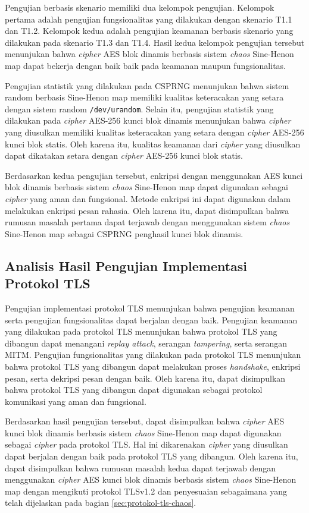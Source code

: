 Pengujian berbasis skenario memiliki dua kelompok pengujian. Kelompok pertama adalah pengujian fungsionalitas yang dilakukan dengan skenario T1.1 dan T1.2. Kelompok kedua adalah pengujian keamanan berbasis skenario yang dilakukan pada skenario T1.3 dan T1.4. Hasil kedua kelompok pengujian tersebut menunjukan bahwa \emph{cipher} AES blok dinamis berbasis sistem \emph{chaos} Sine-Henon map dapat bekerja dengan baik baik pada keamanan maupun fungsionalitas.

Pengujian statistik yang dilakukan pada CSPRNG menunjukan bahwa sistem random berbasis Sine-Henon map memiliki kualitas keteracakan yang setara dengan sistem random \texttt{/dev/urandom}. Selain itu, pengujian statistik yang dilakukan pada \emph{cipher} AES-256 kunci blok dinamis menunjukan bahwa \emph{cipher} yang diusulkan memiliki kualitas keteracakan yang setara dengan \emph{cipher} AES-256 kunci blok statis. Oleh karena itu, kualitas keamanan dari \emph{cipher} yang diusulkan dapat dikatakan setara dengan \emph{cipher} AES-256 kunci blok statis.

Berdasarkan kedua pengujian tersebut, enkripsi dengan menggunakan AES kunci blok dinamis berbasis sistem \emph{chaos} Sine-Henon map dapat digunakan sebagai \emph{cipher} yang aman dan fungsional. Metode enkripsi ini dapat digunakan dalam melakukan enkripsi pesan rahasia. Oleh karena itu, dapat disimpulkan bahwa rumusan masalah pertama dapat terjawab dengan menggunakan sistem \emph{chaos} Sine-Henon map sebagai CSPRNG penghasil kunci blok dinamis.

\subsection{Analisis Hasil Pengujian Implementasi Protokol TLS}

Pengujian implementasi protokol TLS menunjukan bahwa pengujian keamanan serta pengujian fungsionalitas dapat berjalan dengan baik. Pengujian keamanan yang dilakukan pada protokol TLS menunjukan bahwa protokol TLS yang dibangun dapat menangani \emph{replay attack}, serangan \emph{tampering}, serta serangan MITM.  Pengujian fungsionalitas yang dilakukan pada protokol TLS menunjukan bahwa protokol TLS yang dibangun dapat melakukan proses \emph{handshake}, enkripsi pesan, serta dekripsi pesan dengan baik. Oleh karena itu, dapat disimpulkan bahwa protokol TLS yang dibangun dapat digunakan sebagai protokol komunikasi yang aman dan fungsional.

Berdasarkan hasil pengujian tersebut, dapat disimpulkan bahwa \emph{cipher} AES kunci blok dinamis berbasis sistem \emph{chaos} Sine-Henon map dapat digunakan sebagai \emph{cipher} pada protokol TLS. Hal ini dikarenakan \emph{cipher} yang diusulkan dapat berjalan dengan baik pada protokol TLS yang dibangun. Oleh karena itu, dapat disimpulkan bahwa rumusan masalah kedua dapat terjawab dengan menggunakan \emph{cipher} AES kunci blok dinamis berbasis sistem \emph{chaos} Sine-Henon map dengan mengikuti protokol TLSv1.2 dan penyesuaian sebagaimana yang telah dijelaskan pada bagian \ref{sec:protokol-tls-chaos}.

